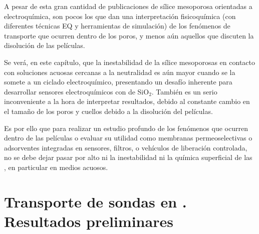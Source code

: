 	A pesar de esta gran cantidad de publicaciones de sílice mesoporosa orientadas a electroquímica, son pocos los que dan una interpretación fisicoquímica (con diferentes técnicas EQ y herramientas de simulación) de los fenómenos de transporte que ocurren dentro de los poros, y menos aún aquellos que discuten la disolución de las películas. 

	Se verá, en este capítulo, que la inestabilidad de la sílice mesoporosas en contacto con soluciones acuosas cercanas a la neutralidad es aún mayor cuando se la somete a un ciclado electroquímico, presentando un desafío inherente para desarrollar sensores electroquímicos con \pdm\space de SiO$_2$. También es un serio inconveniente a la hora de interpretar resultados, debido al constante cambio en el tamaño de los poros y cuellos debido a la disolución del películas. 

	Es por ello que para realizar un estudio profundo de los fenómenos que ocurren dentro de las películas o evaluar su utilidad como membranas permeoselectivas o adsorventes integradas en sensores, filtros, o vehículos de liberación controlada, no se debe dejar pasar por alto ni la inestabilidad ni la química superficial de las \pdm, en particular en medios acuosos. 
	
\section{Transporte de sondas en \pdm. Resultados preliminares}

